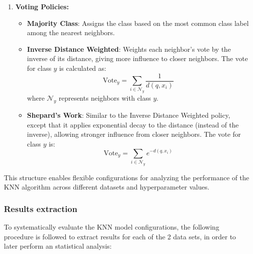 \begin{enumerate}
    \item \textbf{Voting Policies:}
    \begin{itemize}
        \item \textbf{Majority Class}: Assigns the class based on the most common class label among the nearest neighbors.
        \item \textbf{Inverse Distance Weighted}: Weights each neighbor’s vote by the inverse of its distance, giving more influence to closer neighbors. The vote for class $y$ is calculated as:
        \[
        \text{Vote}_y = \sum_{i \in \mathcal{N}_y} \frac{1}{d(q, x_i)}
        \]
        where $\mathcal{N}_y$ represents neighbors with class $y$.
        \item \textbf{Shepard's Work}: Similar to the Inverse Distance Weighted policy, except that it applies exponential decay to the distance (instead of the inverse), allowing stronger influence from closer neighbors. The vote for class $y$ is:
        \[
        \text{Vote}_y = \sum_{i \in \mathcal{N}_y} e^{-d(q, x_i)}
        \]
    \end{itemize}
\end{enumerate}

This structure enables flexible configurations for analyzing the performance of the KNN algorithm across different datasets and hyperparameter values.

\subsubsection{Results extraction}

To systematically evaluate the KNN model configurations, the following procedure is followed to extract results for each of the 2 data sets, in order to later perform an statistical analysis:

